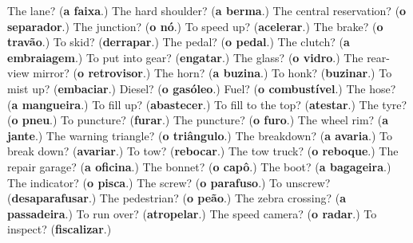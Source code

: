 \begin{tcolorbox}[breakable,colback=teal!4,colframe=teal!35!black,title={Before you move on}]
The lane? (\textbf{a faixa}.) The hard shoulder? (\textbf{a berma}.) The central reservation? (\textbf{o separador}.) The junction? (\textbf{o nó}.) To speed up? (\textbf{acelerar}.) The brake? (\textbf{o travão}.) To skid? (\textbf{derrapar}.) The pedal? (\textbf{o pedal}.) The clutch? (\textbf{a embraiagem}.) To put into gear? (\textbf{engatar}.) The glass? (\textbf{o vidro}.) The rear-view mirror? (\textbf{o retrovisor}.) The horn? (\textbf{a buzina}.) To honk? (\textbf{buzinar}.) To mist up? (\textbf{embaciar}.) Diesel? (\textbf{o gasóleo}.) Fuel? (\textbf{o combustível}.) The hose? (\textbf{a mangueira}.) To fill up? (\textbf{abastecer}.) To fill to the top? (\textbf{atestar}.) The tyre? (\textbf{o pneu}.) To puncture? (\textbf{furar}.) The puncture? (\textbf{o furo}.) The wheel rim? (\textbf{a jante}.) The warning triangle? (\textbf{o triângulo}.) The breakdown? (\textbf{a avaria}.) To break down? (\textbf{avariar}.) To tow? (\textbf{rebocar}.) The tow truck? (\textbf{o reboque}.) The repair garage? (\textbf{a oficina}.) The bonnet? (\textbf{o capô}.) The boot? (\textbf{a bagageira}.) The indicator? (\textbf{o pisca}.) The screw? (\textbf{o parafuso}.) To unscrew? (\textbf{desaparafusar}.) The pedestrian? (\textbf{o peão}.) The zebra crossing? (\textbf{a passadeira}.) To run over? (\textbf{atropelar}.) The speed camera? (\textbf{o radar}.) To inspect? (\textbf{fiscalizar}.)
\end{tcolorbox}

